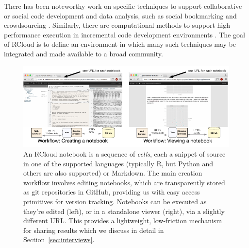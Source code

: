 There has been noteworthy work on specific techniques
to support collaborative or social code development and data analysis,
such as social bookmarking \cite{Millen:2006:DSB} \cite{Heer:2007:VAV}
and crowdsourcing \cite{Fast:2014:ECS}.
Similarly, there are computational methods to support high
performance execution in incremental code development
environments \cite{Guo:2010:TPI}.
The goal of RCloud is to define an environment in which many such
techniques may be integrated and made available to a broad community.
\begin{figure}
\centering
\includegraphics[width=.95\linewidth]{fig/notebook/notebook.pdf}
\caption{\label{fig:notebook}An RCloud notebook is a sequence of
\emph{cells}, each a snippet of source in one of the supported languages (typically R, but Python and others are also supported) or Markdown. The main creation workflow involves editing notebooks, which are transparently stored as git repositories in GitHub, providing us with easy access primitives for version tracking. Notebooks can be executed as they're edited (left), or in a standalone viewer (right), via a slightly different URL. This provides a lightweight, low-friction mechanism for sharing results which we discuss in detail in Section~\ref{sec:interviews}. }
\end{figure}


